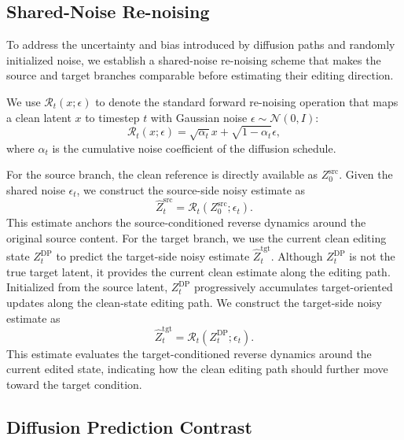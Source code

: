\subsection{Shared-Noise Re-noising}

To address the uncertainty and bias introduced by diffusion paths and randomly initialized noise, we establish a shared-noise re-noising scheme that makes the source and target branches comparable before estimating their editing direction.

We use $\mathcal{R}_t(x;\epsilon)$ to denote the standard forward re-noising operation that maps a clean latent $x$ to timestep $t$ with Gaussian noise $\epsilon \sim \mathcal{N}(0,I)$:
\begin{equation}
\mathcal{R}_t(x;\epsilon)
=
\sqrt{\alpha_t}x
+
\sqrt{1-\alpha_t}\epsilon,
\end{equation}
where $\alpha_t$ is the cumulative noise coefficient of the diffusion schedule.

For the source branch, the clean reference is directly available as $Z^{\mathrm{src}}_0$.
Given the shared noise $\epsilon_t$, we construct the source-side noisy estimate as
\begin{equation}
\hat{Z}^{\mathrm{src}}_t
=
\mathcal{R}_t(Z^{\mathrm{src}}_0;\epsilon_t).
\end{equation}
This estimate anchors the source-conditioned reverse dynamics around the original source content.
For the target branch, we use the current clean editing state $Z_t^{\text{DP}}$ to predict the target-side noisy estimate $\hat{Z}^{\mathrm{tgt}}_t$.
Although $Z_t^{\text{DP}}$ is not the true target latent, it provides the current clean estimate along the editing path.
Initialized from the source latent, $Z_t^{\text{DP}}$ progressively accumulates target-oriented updates along the clean-state editing path.
We construct the target-side noisy estimate as
\begin{equation}
\hat{Z}^{\mathrm{tgt}}_t
=
\mathcal{R}_t(Z_t^{\text{DP}};\epsilon_t).
\end{equation}
This estimate evaluates the target-conditioned reverse dynamics around the current edited state, indicating how the clean editing path should further move toward the target condition.

\subsection{Diffusion Prediction Contrast}

